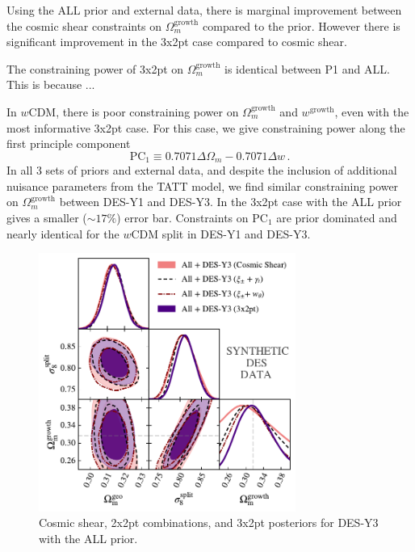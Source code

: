 Using the ALL prior and external data, there is marginal improvement between the cosmic shear constraints on $\Omega_m^\mathrm{growth}$ compared to the prior. However there is significant improvement in the 3x2pt case compared to cosmic shear. 

The constraining power of 3x2pt on $\Omega_m^\mathrm{growth}$ is identical between P1 and ALL. This is because ...

In $w$CDM, there is poor constraining power on $\Omega_m^\mathrm{growth}$ and $w^{\mathrm{growth}}$, even with the most informative 3x2pt case. For this case, we give constraining power along the first principle component
\begin{equation}
	\mathrm{PC}_1 \equiv 0.7071\Delta\Omega_m - 0.7071\Delta w\,.
\end{equation}
In all 3 sets of priors and external data, and despite the inclusion of additional nuisance parameters from the TATT model, we find similar constraining power on $\Omega_m^\mathrm{growth}$ between DES-Y1 and DES-Y3. In the 3x2pt case with the ALL prior gives a smaller ($\sim17\%$) error bar. Constraints on $\mathrm{PC}_1$ are prior dominated and nearly identical for the $w$CDM split in DES-Y1 and DES-Y3.
\begin{figure}[ht]
	\centering
	\includegraphics[width=0.75\textwidth]{plots/plot36_S8.pdf}
	\caption{Cosmic shear, 2x2pt combinations, and 3x2pt posteriors for DES-Y3 with the ALL prior.}
	\label{fig:syn_y3_probe}
\end{figure}
